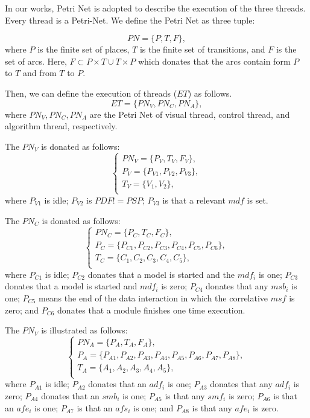 \documentclass[journal,UTF8]{IEEEtran}
\begin{document}
  In our works, Petri Net is adopted to describe the execution of the three threads. Every thread is a Petri-Net. We define the Petri Net as three tuple:
 
 \begin{equation}
PN = \{P,T,F\},
 \end{equation} 
 where $P$ is the finite set of places, $T$ is the finite set of transitions, and $F$ is the set of arcs. Here, $F \subset P\times T \cup T\times P$ which donates that the arcs contain form $P$ to $T$ and from $T$ to $P$.
 
 Then, we can define the execution of threads ($ET$) as follows.
 \begin{equation}
ET = \{PN_V,PN_C,PN_A\},
\end{equation} 
where $PN_V,PN_C,PN_A$ are the Petri Net of visual thread, control thread, and algorithm thread, respectively.

The $PN_V$ is donated as follows:
 \begin{equation}
\left\{
\begin{array}{l}
PN_V= \{P_V,T_V,F_V\},\\
P_V=\{P_{V1}, P_{V2}, P_{V3}\},\\
T_V=\{V_1,V_2\},\\
\end{array}
\right.
\end{equation} 
where $P_{V1}$ is idle; $P_{V2}$ is $PDF != PSP$; $P_{V3}$ is that a relevant $mdf$ is set.

The $PN_C$ is donated as follows:
\begin{equation}
\left\{
\begin{array}{l}
PN_C= \{P_C,T_C,F_C\},\\
P_C=\{P_{C1}, P_{C2}, P_{C3}, P_{C4}, P_{C5}, P_{C6}\},\\
T_C=\{C_1,C_2,C_3,C_4,C_5\},\\
\end{array}
\right.
\end{equation} 
where $P_{C1}$ is idle; $P_{C2}$ donates that a model is started and the $mdf_i$ is one; $P_{C3}$ donates that a model is started and $mdf_i$ is zero; $P_{C4}$ donates that any $msb_i$ is one; $P_{C5}$ means the end of the data interaction in which the  correlative $msf$ is zero; and $P_{C6}$ donates that a module finishes one time execution.

The $PN_V$ is illustrated as follows:
\begin{equation}
\left\{
\begin{array}{l}
PN_A= \{P_A,T_A,F_A\},\\
P_A=\{P_{A1}, P_{A2}, P_{A3}, P_{A4}, P_{A5}, P_{A6}, P_{A7}, P_{A8}\},\\
T_A=\{A_1,A_2,A_3,A_4,A_5\},\\
\end{array}
\right.
\end{equation} 
where $P_{A1}$ is idle; $P_{A2}$ donates that an $adf_i$ is one; $P_{A3}$ donates that any $adf_i$ is zero; $P_{A4}$ donates that an $smb_i$ is one; $P_{A5}$ is that any $smf_i$ is zero; $P_{A6}$ is that an $afe_i$ is one; $P_{A7}$ is that an $afs_i$ is one; and $P_{A8}$ is that any $afe_i$ is zero.   
\end{document}
